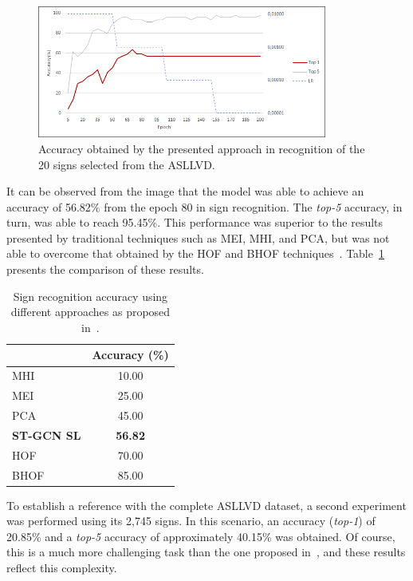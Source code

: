 \begin{figure}[!t]
    \centering
    \includegraphics[width=0.85\textwidth]{images/results_20}
    \caption{Accuracy obtained by the presented approach in recognition of the 20 signs selected from the ASLLVD.}
    \label{fig:training-asllvd-20}
\end{figure}

It can be observed from the image that the model was able to achieve an accuracy of 56.82\% from the epoch 80 in sign recognition. The \textit{top-5} accuracy, in turn, was able to reach 95.45\%. This performance was superior to the results presented by traditional techniques such as MEI, MHI, and PCA, but was not able to overcome that obtained by the HOF and BHOF techniques~\cite{lim-2016}. Table~\ref{tab:results-comparison-20} presents the comparison of these results.

\begin{table}[ht]
\centering
\caption{Sign recognition accuracy using different approaches as proposed in~\cite{lim-2016}.}
\label{tab:results-comparison-20}
\begin{tabular}{lc}
\hline
                   & Accuracy (\%)  \\ \hline
MHI                & 10.00                     \\
MEI                & 25.00                     \\
PCA                & 45.00                     \\
\textbf{ST-GCN SL} & \textbf{56.82}            \\
HOF                & 70.00                     \\
BHOF               & 85.00                     \\ \hline
\end{tabular}
\end{table}

To establish a reference with the complete ASLLVD dataset, a second experiment was performed using its 2,745 signs. In this scenario, an accuracy (\textit{top-1}) of 20.85\% and a \textit{top-5} accuracy of approximately 40.15\% was obtained. Of course, this is a much more challenging task than the one proposed in~\cite{lim-2016}, and these results reflect this complexity.

